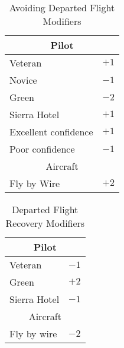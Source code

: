 \begin{table}
\centering
\caption{Avoiding Departed Flight Modifiers}
\medskip
\begin{tabular}{ll}
\hline
\multicolumn{2}{c}{Pilot}\\
\hline
Veteran                 &$+1$\\
Novice                  &$-1$\\
Green                   &$-2$\\
Sierra Hotel            &$+1$\\
Excellent confidence    &$+1$\\
Poor confidence         &$-1$\\
\hline
\multicolumn{2}{c}{Aircraft}\\
\hline
Fly by Wire             &$+2$\\
\hline
\end{tabular}
\end{table}

\begin{table}
\centering
\caption{Departed Flight Recovery Modifiers}
\medskip
\begin{tabular}{ll}
\hline
\multicolumn{2}{c}{Pilot}\\
\hline
Veteran                 &$-1$\\
Green                   &$+2$\\
Sierra Hotel           &$-1$\\
\hline
\multicolumn{2}{c}{Aircraft}\\
\hline
Fly by wire             &$-2$\\
\hline
\end{tabular}
\end{table}

